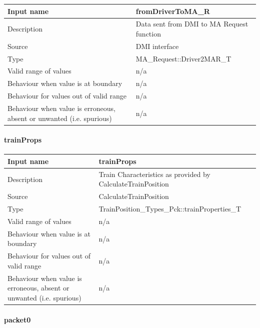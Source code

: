 \begin{longtable}{p{}p{}}
\toprule
Input name				& fromDriverToMA\_R\\
\midrule
Description				& Data sent from DMI to MA Request function  \\
\midrule
Source					& DMI interface \\ 
\midrule
Type					& MA\_Request::Driver2MAR\_T\\
\midrule
Valid range of values	& n/a \\
\midrule
Behaviour when value is at boundary	& n/a\\
\midrule
Behaviour for values out of valid range	& n/a\\
\midrule
Behaviour when value is erroneous, absent or unwanted (i.e. spurious) & n/a\\

\bottomrule


\end{longtable}

\paragraph{trainProps}

\begin{longtable}{p{}p{}}
\toprule
Input name				& trainProps\\
\midrule
Description				& Train Characteristics as provided by CalculateTrainPosition  \\
\midrule
Source					& CalculateTrainPosition \\ 
\midrule
Type					& TrainPosition\_Types\_Pck::trainProperties\_T\\
\midrule
Valid range of values	& n/a \\
\midrule
Behaviour when value is at boundary	& n/a\\
\midrule
Behaviour for values out of valid range	& n/a\\
\midrule
Behaviour when value is erroneous, absent or unwanted (i.e. spurious) & n/a\\

\bottomrule


\end{longtable}

\paragraph{packet0}

